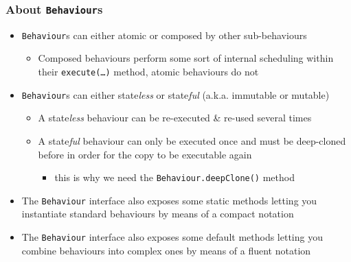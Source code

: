 \documentclass[presentation]{beamer}\mode<presentation>{\usetheme{AMSCesenaPurpleAndGold}}
\begin{document}
\begin{frame}%
    \frametitle{About \texttt{Behaviour}s}

    \begin{itemize}
        \item \texttt{Behaviour}s can either \alert{atomic} or \alert{composed} by other sub-behaviours
        \begin{itemize}
            \item \alert{Composed} behaviours perform some sort of \alert{internal scheduling} within their \texttt{execute(\ldots)} method, atomic behaviours do not
        \end{itemize}

        \vfill

        \item \texttt{Behaviour}s can either \alert{state\emph{less}} or \alert{state\emph{ful}} (a.k.a. immutable or mutable)
        \begin{itemize}
            \item A state\emph{less} behaviour can be \alert{re-executed \& re-used} several times

            \item A state\emph{ful} behaviour can only be executed \alert{once} and must be \alert{deep-cloned} before in order for the copy to be executable again
            \begin{itemize}
                \item this is why we need the \texttt{Behaviour.\alert{deepClone()}} method
            \end{itemize}
        \end{itemize}

        \vfill

        \item The \texttt{Behaviour} interface also exposes some \alert{static methods} letting you instantiate standard behaviours by means of a compact notation

        \vfill

        \item The \texttt{Behaviour} interface also exposes some \alert{default methods} letting you combine behaviours into complex ones by means of a \alert{fluent} notation
    \end{itemize}

\end{frame}
\end{document}
